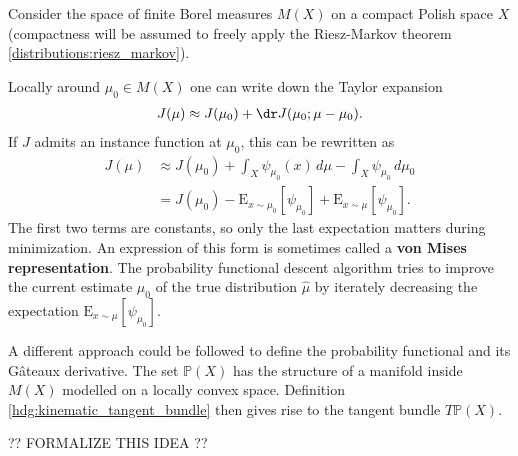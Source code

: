     Consider the space of finite Borel measures $M(X)$ on a compact Polish space $X$ (compactness will be assumed to freely apply the Riesz-Markov theorem \ref{distributions:riesz_markov}).


    Locally around $\mu_0\in M(X)$ one can write down the Taylor expansion
    \begin{gather*}
        J(\mu)\approx J(\mu_0) + \dr J(\mu_0;\mu-\mu_0).
    \end{gather*}
    If $J$ admits an instance function at $\mu_0$, this can be rewritten as
    \begin{align*}
        J(\mu)&\approx J(\mu_0) + \int_X\psi_{\mu_0}(x)\,d\mu - \int_X\psi_{\mu_0}\,d\mu_0\\
        &= J(\mu_0) - \mathrm{E}_{x\sim\mu_0}[\psi_{\mu_0}] + \mathrm{E}_{x\sim\mu}[\psi_{\mu_0}].
    \end{align*}
    The first two terms are constants, so only the last expectation matters during minimization. An expression of this form is sometimes called a \textbf{von Mises representation}. The probability functional descent algorithm tries to improve the current estimate $\mu_0$ of the true distribution $\widehat{\mu}$ by iterately decreasing the expectation $\mathrm{E}_{x\sim\mu}[\psi_{\mu_0}]$.

    A different approach could be followed to define the probability functional and its G\^ateaux derivative. The set $\mathbb{P}(X)$ has the structure of a manifold inside $M(X)$ modelled on a locally convex space. Definition \ref{hdg:kinematic_tangent_bundle} then gives rise to the tangent bundle $T\mathbb{P}(X)$.

    ?? FORMALIZE THIS IDEA ??